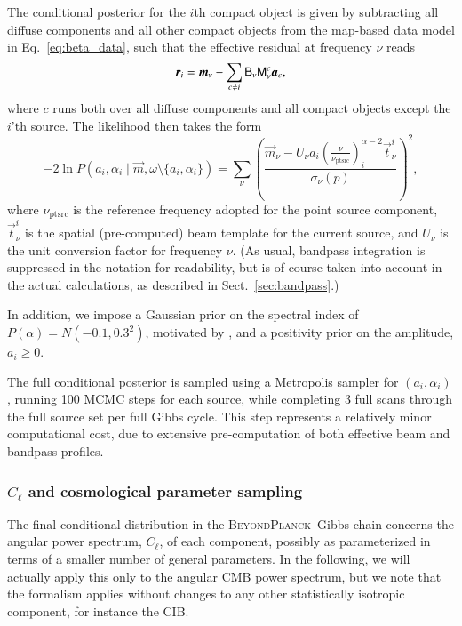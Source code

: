 \documentclass[onecolumn]{aa}
\renewcommand{\t}[0]{\vec{t}}
\renewcommand{\a}[0]{\vec{a}}
\newcommand{\m}[0]{\vec{m}}
\newcommand{\B}[0]{\tens{B}}
\newcommand{\M}[0]{\tens{M}}
\renewcommand{\r}[0]{\vec{r}}
\newcommand{\BP}{\textsc{BeyondPlanck}}
\begin{document}
The conditional posterior for the $i$th compact object is given by
subtracting all diffuse components and all other compact objects from
the map-based data model in Eq.~\eqref{eq:beta_data}, such that the
effective residual at frequency $\nu$ reads
\begin{equation}
  \r_{i} = \m_{\nu} - \sum_{c\ne i} \B_{\nu}\M^c_{\nu}\a_c,
\end{equation}
where $c$ runs both over all diffuse components and all compact
objects except the $i$'th source. The likelihood then takes the form
\begin{equation}
  -2\ln P(a_i, \alpha_i\mid \m, \omega\setminus \{a_i, \alpha_i\}) =
  \sum_{\nu}\left(\frac{\m_{\nu} - U_\nu
    a_i\left(\frac{\nu}{\nu_{\mathrm{ptsrc}}}\right)^{\alpha-2}_i \t_{\nu}^i}{\sigma_{\nu}(p)}\right)^2,
\label{eq:lnL_likelihood}
\end{equation}
where $\nu_{\mathrm{ptsrc}}$ is the reference frequency adopted for
the point source component, $\t_\nu^i$ is the spatial (pre-computed)
beam template for the current source, and $U_\nu$ is the unit
conversion factor for frequency $\nu$. (As usual, bandpass integration
is suppressed in the notation for readability, but is of course taken
into account in the actual calculations, as described in
Sect.~\ref{sec:bandpass}.) 

In addition, we impose a Gaussian prior on the spectral index of
$P(\alpha) = N(-0.1,0.3^2)$, motivated by \citet{bennett2012}, and a
positivity prior on the amplitude, $a_i \ge 0$.

The full conditional posterior is sampled using a Metropolis sampler
for $(a_i, \alpha_i)$, running 100 MCMC steps for each source, while
completing 3 full scans through the full source set per full Gibbs
cycle. This step represents a relatively minor computational cost, due
to extensive pre-computation of both effective beam and bandpass
profiles.

\subsubsection{$C_{\ell}$ and cosmological parameter sampling}
\label{sec:powspec}  

The final conditional distribution in the \BP\ Gibbs chain concerns
the angular power spectrum, $C_{\ell}$, of each component, possibly as
parameterized in terms of a smaller number of general parameters. In
the following, we will actually apply this only to the angular CMB
power spectrum, but we note that the formalism applies without changes to
any other statistically isotropic component, for instance the CIB.
\end{document}
